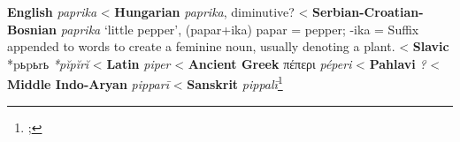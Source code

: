 \begin{etymology}\label{ety:paprika}
\textbf{English} \textit{paprika}
< \textbf{Hungarian} \textit{paprika}, diminutive?
< \textbf{Serbian-Croatian-Bosnian} \textit{paprika} `little pepper', (papar+ika) papar = pepper; -ika = Suffix appended to words to create a feminine noun, usually denoting a plant.
< \textbf{Slavic} {*pьpьrь} \textit{*pĭpĭrĭ }
< \textbf{Latin} \textit{piper}
< \textbf{Ancient Greek} {πέπερι} \textit{péperi}
< \textbf{Pahlavi} \textit{?}
< \textbf{Middle Indo-Aryan} \textit{pipparī}
< \textbf{Sanskrit} \textit{pippalī}\footnote{; }
\end{etymology}